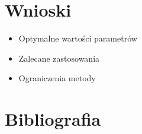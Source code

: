 \documentclass[12pt]{article}
\begin{document}
\section{Wnioski}
\begin{itemize}
    \item Optymalne wartości parametrów
    \item Zalecane zastosowania
    \item Ograniczenia metody
\end{itemize}

\section{Bibliografia}
\begin{thebibliography}{9}
\end{thebibliography}
\end{document}
